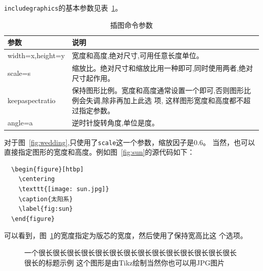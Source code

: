 \texttt{includegraphics}的基本参数见表~\ref{tab:figure}。

\begin{table}[htbp]
  \centering
  \caption{插图命令参数}
  \label{tab:figure}
  \vspace{0.2cm}
  \wuhao
  \begin{tabularx}{0.8\textwidth{}}{lX}
    \toprule
    参数             & 说明                                                             \\
    \midrule
    width=x,height=y & 宽度和高度,绝对尺寸,可用任意长度单位。                           \\
    scale=s          & 缩放比。绝对尺寸和缩放比用一种即可,同时使用两者,绝对尺寸起作用。 \\
    keepaspectratio  & 保持图形比例。宽度和高度通常设置一个即可,否则图形比
    例会失调,除非再加上此选 项,
    这样图形宽度和高度都不超过指定参数。                                                \\
    angle=a          & 逆时针旋转角度,单位是度。                                        \\
    \bottomrule
  \end{tabularx}
\end{table}

对于图~\ref{fig:wedding},只使用了\texttt{scale}这一个参数，缩放因子是0.6。
当然，也可以直接指定图形的宽度和高度。例如图~\ref{fig:sun}的源代码如下：

\begin{lstlisting}
  \begin{figure}[htbp]
    \centering
    \texttt{[image: sun.jpg]}
    \caption{太阳系}
    \label{fig:sun}
  \end{figure}
\end{lstlisting}

可以看到，图~\ref{fig:longcap}的宽度指定为版芯的宽度，然后使用了保持宽高比这
个选项。

\begin{figure}[tbph]
  \usetikzlibrary{calc,through}
  \centering

  \caption{一个很长很长很长很长很长很长很长很长很长很长很长很长很长很长很长的标题示例
    这个图形是由Tikz绘制当然你也可以用JPG图片}
  \label{fig:longcap}
\end{figure}

